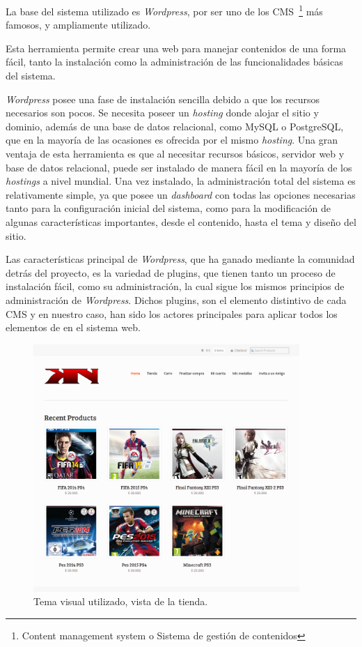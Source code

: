 La base del sistema utilizado es \emph{Wordpress}, por ser uno de los
CMS~\footnote{Content management system o Sistema de gestión de contenidos}
más famosos, y ampliamente utilizado\cite{CmsPerformance}.

Esta herramienta permite crear una web para manejar contenidos de una forma fácil,
tanto la instalación como la administración de las funcionalidades básicas del sistema.

\emph{Wordpress} posee una fase de instalación sencilla debido a que los recursos
necesarios son pocos. Se necesita poseer un \emph{hosting} donde alojar el sitio y
dominio, además de una base de datos relacional, como MySQL o PostgreSQL, que en la mayoría
de las ocasiones es ofrecida por el mismo \emph{hosting}.
Una gran ventaja de esta herramienta es que al necesitar recursos básicos,
servidor web y base de datos relacional, puede ser instalado de manera fácil en la
mayoría de los \emph{hostings} a nivel mundial.
Una vez instalado, la administración total del sistema es relativamente simple,
ya que posee un \emph{dashboard} con todas las opciones necesarias
tanto para la configuración inicial del sistema, como para la modificación
de algunas características importantes, desde el contenido, hasta el tema
y diseño del sitio.

Las características principal de \emph{Wordpress}, que ha ganado mediante
la comunidad detrás del proyecto, es la variedad de plugins, que
tienen tanto un proceso de instalación fácil, como su administración,
la cual sigue los mismos principios de administración de \emph{Wordpress}.
Dichos plugins, son el elemento distintivo de cada CMS
y en nuestro caso, han sido los actores principales para aplicar
todos los elementos de {\GAM} en el sistema web.

\begin{figure}[!htb]
  \centering
  \includegraphics[width=0.9\textwidth]{images/Tienda/Tienda.png}
  \caption[Tema visual tienda.]{Tema visual utilizado, vista de la tienda.}
  \label{fig:Players}
\end{figure}



